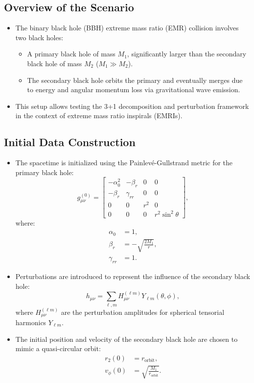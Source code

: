 \documentclass[12pt]{article}
\begin{document}
\subsection{Overview of the Scenario}
\begin{itemize}
    \item The binary black hole (BBH) extreme mass ratio (EMR) collision involves two black holes:
    \begin{itemize}
        \item A primary black hole of mass $M_1$, significantly larger than the secondary black hole of mass $M_2$ ($M_1 \gg M_2$).
        \item The secondary black hole orbits the primary and eventually merges due to energy and angular momentum loss via gravitational wave emission.
    \end{itemize}
    \item This setup allows testing the 3+1 decomposition and perturbation framework in the context of extreme mass ratio inspirals (EMRIs).
\end{itemize}

\subsection{Initial Data Construction}
\begin{itemize}
    \item The spacetime is initialized using the Painlevé-Gullstrand metric for the primary black hole:
    \[
    g_{\mu\nu}^{(0)} = 
    \begin{bmatrix}
    -\alpha_0^2 & -\beta_r & 0 & 0 \\
    -\beta_r & \gamma_{rr} & 0 & 0 \\
    0 & 0 & r^2 & 0 \\
    0 & 0 & 0 & r^2 \sin^2\theta
    \end{bmatrix},
    \]
    where:
    \begin{align*}
        \alpha_0 &= 1, \\
        \beta_r &= -\sqrt{\frac{2M_1}{r}}, \\
        \gamma_{rr} &= 1.
    \end{align*}
    \item Perturbations are introduced to represent the influence of the secondary black hole:
    \[
    h_{\mu\nu} = \sum_{\ell,m} H_{\mu\nu}^{(\ell m)} Y_{\ell m}(\theta, \phi),
    \]
    where $H_{\mu\nu}^{(\ell m)}$ are the perturbation amplitudes for spherical tensorial harmonics $Y_{\ell m}$.
    \item The initial position and velocity of the secondary black hole are chosen to mimic a quasi-circular orbit:
    \begin{align*}
        r_2(0) &= r_{\text{orbit}}, \\
        v_\phi(0) &= \sqrt{\frac{M_1}{r_{\text{orbit}}}}.
    \end{align*}
\end{itemize}
\end{document}
